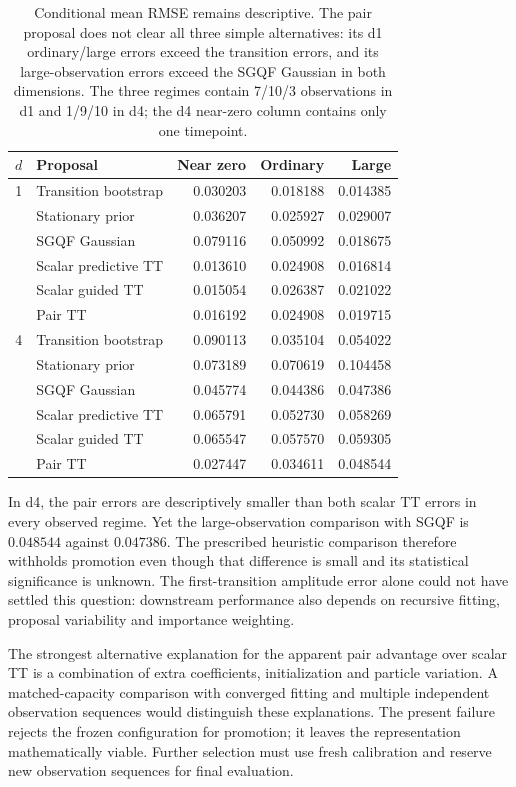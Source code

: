 \documentclass[11pt]{article}
\begin{document}
\begin{table}[htbp]
\centering
\begin{tabular}{clrrr}
\toprule
$d$ & Proposal & Near zero & Ordinary & Large\\
\midrule
1 & Transition bootstrap & 0.030203 & 0.018188 & 0.014385\\
  & Stationary prior     & 0.036207 & 0.025927 & 0.029007\\
  & SGQF Gaussian        & 0.079116 & 0.050992 & 0.018675\\
  & Scalar predictive TT & 0.013610 & 0.024908 & 0.016814\\
  & Scalar guided TT     & 0.015054 & 0.026387 & 0.021022\\
  & Pair TT              & 0.016192 & 0.024908 & 0.019715\\
\midrule
4 & Transition bootstrap & 0.090113 & 0.035104 & 0.054022\\
  & Stationary prior     & 0.073189 & 0.070619 & 0.104458\\
  & SGQF Gaussian        & 0.045774 & 0.044386 & 0.047386\\
  & Scalar predictive TT & 0.065791 & 0.052730 & 0.058269\\
  & Scalar guided TT     & 0.065547 & 0.057570 & 0.059305\\
  & Pair TT              & 0.027447 & 0.034611 & 0.048544\\
\bottomrule
\end{tabular}
\caption{Conditional mean RMSE remains descriptive. The pair proposal does
not clear all three simple alternatives: its d1 ordinary/large errors exceed
the transition errors, and its large-observation errors exceed the SGQF
Gaussian in both dimensions. The three regimes contain 7/10/3 observations
in d1 and 1/9/10 in d4; the d4 near-zero column contains only one timepoint.}
\label{tab:pair-conditional-errors}
\end{table}

In d4, the pair errors are descriptively smaller than both scalar TT errors
in every observed regime. Yet the large-observation comparison with SGQF is
$0.048544$ against $0.047386$. The prescribed heuristic comparison therefore
withholds promotion even though that difference is small and its statistical
significance is unknown. The first-transition amplitude error alone could
not have settled this question: downstream performance also depends on
recursive fitting, proposal variability and importance weighting.

\begin{samepage}
The strongest alternative explanation for the apparent pair advantage over
scalar TT is a combination of extra coefficients, initialization and particle
variation. A matched-capacity comparison with converged fitting and multiple
independent observation sequences would distinguish these explanations.
The present failure rejects the frozen configuration for promotion; it leaves
the representation mathematically viable. Further selection must use fresh
calibration and reserve new observation sequences for final evaluation.
\par
\end{samepage}
\end{document}

